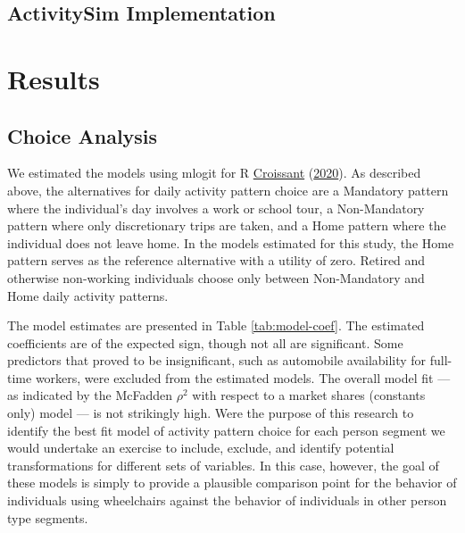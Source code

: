 \documentclass[3p, authoryear, review]{elsarticle} %
\begin{document}
\hypertarget{activitysim-implementation}{%
\subsection{ActivitySim Implementation}\label{activitysim-implementation}}

\hypertarget{results}{%
\section{Results}\label{results}}

\hypertarget{choice-analysis}{%
\subsection{Choice Analysis}\label{choice-analysis}}

We estimated the models using mlogit for R \protect\hyperlink{ref-mlogit2020}{Croissant} (\protect\hyperlink{ref-mlogit2020}{2020}). As described above, the
alternatives for daily activity pattern choice are a Mandatory pattern where the
individual's day involves a work or school tour, a Non-Mandatory pattern where
only discretionary trips are taken, and a Home pattern where the individual does
not leave home. In the models estimated for this study, the Home pattern serves
as the reference alternative with a utility of zero. Retired and otherwise
non-working individuals choose only between Non-Mandatory and Home daily activity
patterns.

The model estimates are presented in
Table \ref{tab:model-coef}.
The estimated coefficients are of the expected sign, though not all are significant.
Some predictors that proved to be insignificant, such as automobile availability
for full-time workers, were excluded from the estimated models.
The overall model fit --- as indicated by the McFadden \(\rho^2\) with respect to
a market shares (constants only) model --- is not strikingly high. Were the purpose
of this research to identify the best fit model of activity pattern choice for
each person segment we would undertake an exercise to include, exclude, and identify
potential transformations for different sets of variables. In this case, however,
the goal of these models is simply to provide a plausible comparison point for
the behavior of individuals using wheelchairs against the behavior of individuals
in other person type segments.
\end{document}

